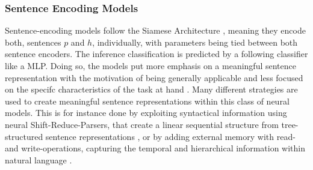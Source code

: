 \subsubsection{Sentence Encoding Models}
Sentence-encoding models follow the Siamese Architecture \citep{bromley1994signature}, meaning they encode both, sentences $p$ and $h$, individually, with parameters being tied between both sentence encoders. The inference classification is predicted by a following classifier like a \ac{MLP}. Doing so, the models put more emphasis on a meaningful sentence representation with the motivation of being generally applicable and less focused on the specifc characteristics of the task at hand \citep{bowman2016fast}. Many different strategies are used to create meaningful sentence representations within this class of neural models. This is for instance done by exploiting syntactical information using neural Shift-Reduce-Parsers, that create a linear sequential structure from tree-structured sentence representations \citep{bowman2016fast}, or by adding external memory with read- and write-operations, capturing the temporal and hierarchical information within natural language \citep{munkhdalai2017neural}. 

